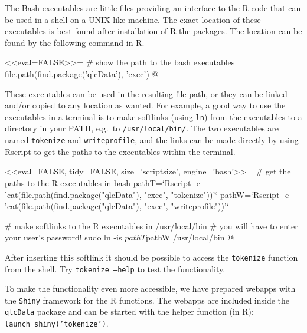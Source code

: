 The Bash executables are little files providing an interface to the R code that
can be used in a shell on a UNIX-like machine. The exact location of these
executables is best found after installation of R the packages. The
location can be found by the following command in R. 

<<eval=FALSE>>=
# show the path to the bash executables
file.path(find.package('qlcData'), 'exec')
@

These executables can be 
used in the resulting file path, or they can be linked and/or copied to any location as wanted. 
For example, a good way to use the executables in a terminal is to
make softlinks (using \texttt{ln}) from the executables to a directory in your
PATH, e.g.\ to \texttt{/usr/local/bin/}. The two executables are named
\texttt{tokenize} and \texttt{writeprofile}, and the links can be made directly 
by using Rscript to get the paths to the executables within the terminal.

<<eval=FALSE, tidy=FALSE, size='scriptsize', engine='bash'>>=
# get the paths to the R executables in bash
pathT=`Rscript -e 'cat(file.path(find.package("qlcData"), 
  "exec", "tokenize"))'`
pathW=`Rscript -e 'cat(file.path(find.package("qlcData"), 
  "exec", "writeprofile"))'`

# make softlinks to the R executables in /usr/local/bin
# you will have to enter your user's password!
sudo ln -is $pathT $pathW /usr/local/bin
@

After inserting this softlink it should be possible to access the
\texttt{tokenize} function from the shell. Try \texttt{tokenize --help} to test
the functionality.



To make the functionality even more accessible, we have prepared webapps with 
the \texttt{Shiny} framework for the R functions. The webapps are 
included inside the \texttt{qlcData} package and can be started with the 
helper function (in R): \texttt{launch\_shiny('tokenize')}.




